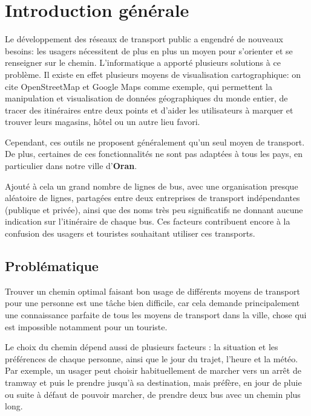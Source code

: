 \renewcommand\labelitemi{$\bullet$}
\renewcommand\labelitemii{$\circ$}
\chapter{Introduction générale}

Le développement des réseaux de transport public a engendré de nouveaux besoins: les usagers nécessitent de plus en plus un moyen pour s'orienter et se renseigner sur le chemin.\newline
L'informatique a apporté plusieurs solutions à ce problème. Il existe en effet plusieurs moyens de visualisation cartographique: on cite OpenStreetMap et Google Maps comme exemple, qui permettent la manipulation et visualisation de données géographiques du monde entier, de tracer des itinéraires entre deux points et d'aider les utilisateurs à marquer et trouver leurs magasins, hôtel ou un autre lieu favori.


Cependant, ces outils ne proposent généralement qu'un seul moyen de transport. De plus, certaines de ces fonctionnalités ne sont pas adaptées à tous les pays, en particulier dans notre ville d'\textbf{Oran}. 

Ajouté à cela un grand nombre de lignes de bus, avec une organisation presque aléatoire de lignes, partagées entre deux entreprises de transport indépendantes (publique et privée), ainsi que des noms très peu significatifs ne donnant aucune indication sur l'itinéraire de chaque bus.\newline
Ces facteurs contribuent encore à la confusion des usagers et touristes souhaitant utiliser ces transports.

\section{Problématique}
Trouver un chemin optimal faisant bon usage de différents moyens de transport pour une personne est une tâche bien difficile, car cela demande principalement une connaissance parfaite de tous les moyens de transport dans la ville, chose qui est impossible notamment pour un touriste.\newline

Le choix du chemin dépend aussi de plusieurs facteurs : la situation et les préférences de chaque personne, ainsi que le jour du trajet, l'heure et la météo. Par exemple, un usager peut choisir habituellement de marcher vers un arrêt de tramway et
puis le prendre jusqu'à sa destination, mais préfère, en jour de pluie ou suite à défaut de pouvoir marcher, de prendre deux bus avec un chemin plus long.

